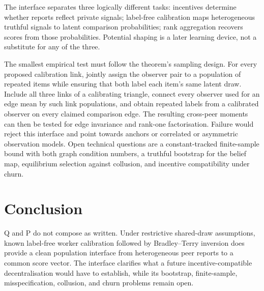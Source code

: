 \documentclass{article}
\begin{document}
The interface separates three logically different tasks: incentives determine whether reports reflect private signals; label-free calibration maps heterogeneous truthful signals to latent comparison probabilities; rank aggregation recovers scores from those probabilities.  Potential shaping is a later learning device, not a substitute for any of the three. %

The smallest empirical test must follow the theorem's sampling design.  For every proposed calibration link, jointly assign the observer pair to a population of repeated items while ensuring that both label each item's same latent draw.  Include all three links of a calibrating triangle, connect every observer used for an edge mean by such link populations, and obtain repeated labels from a calibrated observer on every claimed comparison edge.  The resulting cross-peer moments can then be tested for edge invariance and rank-one factorisation.  Failure would reject this interface and point towards anchors or correlated or asymmetric observation models. %
Open technical questions are a constant-tracked finite-sample bound with both graph condition numbers, a truthful bootstrap for the belief map, equilibrium selection against collusion, and incentive compatibility under churn. %

\section{Conclusion}

Q and P do not compose as written.  Under restrictive shared-draw assumptions, known label-free worker calibration followed by Bradley--Terry inversion does provide a clean population interface from heterogeneous peer reports to a common score vector. %
The interface clarifies what a future incentive-compatible decentralisation would have to establish, while its bootstrap, finite-sample, misspecification, collusion, and churn problems remain open. %



\end{document}
